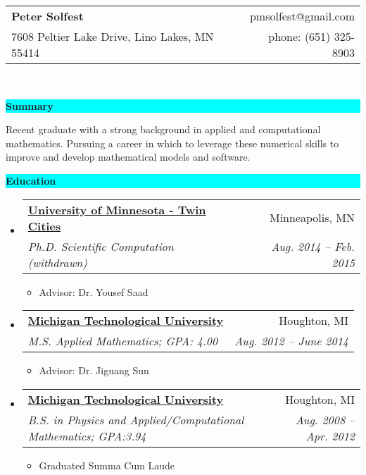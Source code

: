 \documentclass[letterpaper,10pt]{article}
\makeatletter
\newcommand{\resitem}[1]{\item #1 \vspace{-2pt}}
\newcommand{\resheading}[1]{{\large \colorbox{Cyan}{\begin{minipage}{\textwidth}{\textbf{#1 \vphantom{p\^{E}}}}\end{minipage}}}}
\newcommand{\ressubheading}[4]{
\begin{tabular*}{6.5in}{l@{\extracolsep{\fill}}r}
		\textbf{#1} & #2 \\
		\textit{#3} & \textit{#4} \\
\end{tabular*}\vspace{-6pt}}
\makeatother
\begin{document}
\newcommand{\mywebheader}{
\begin{tabular*}{7in}{l@{\extracolsep{\fill}}r}
	\textbf{\LARGE Peter Solfest} & pmsolfest@gmail.com\\
	{\footnotesize 7608 Peltier Lake Drive, Lino Lakes, MN 55414} & phone: (651) 325-8903 \\
	\end{tabular*}
\\
\vspace{0.1in}}

\mywebheader

\resheading{Summary}
  
  Recent graduate with a strong background in applied and computational mathematics.
  Pursuing a career in which to leverage these numerical skills to improve
  and develop mathematical models and software.

  \vspace{0.1in}
\resheading{Education}
	\begin{itemize}
  \item
			\ressubheading{\href{www.umn.edu}{University of Minnesota - Twin Cities}}{Minneapolis, MN}{Ph.D. Scientific Computation (withdrawn)}{Aug. 2014 -- Feb. 2015}
			{ \footnotesize
			\begin{itemize}
					\resitem{Advisor: Dr. Yousef Saad} 
				\end{itemize}
				}
		\item
			\ressubheading{\href{www.mtu.edu}{Michigan Technological University}}{Houghton, MI}{M.S. Applied Mathematics; GPA: 4.00}{Aug. 2012 -- June 2014}
				{ \footnotesize
				\begin{itemize}
					\resitem{Advisor: Dr. Jiguang Sun} 
				\end{itemize}
				}
		\item
			\ressubheading{\href{www.mtu.edu}{Michigan Technological University}}{Houghton, MI}{B.S. in Physics and Applied/Computational Mathematics; GPA:3.94}{Aug. 2008 -- Apr. 2012}
				{ \footnotesize
				\begin{itemize}
					\resitem{Graduated Summa Cum Laude} 
				\end{itemize}
				}
\begin{comment}%
		\item
			\ressubheading{\href{http://www.isd12.org/chs/}{Centennial High School}}{Circle Pines, MN}{GPA:3.79}{Sep. 2003 - June 2008}
				{ \footnotesize
				\begin{itemize}
				\resitem{Graduated with honors}
				\end{itemize}
				}
\end{comment}
	\end{itemize} %
\end{document}
